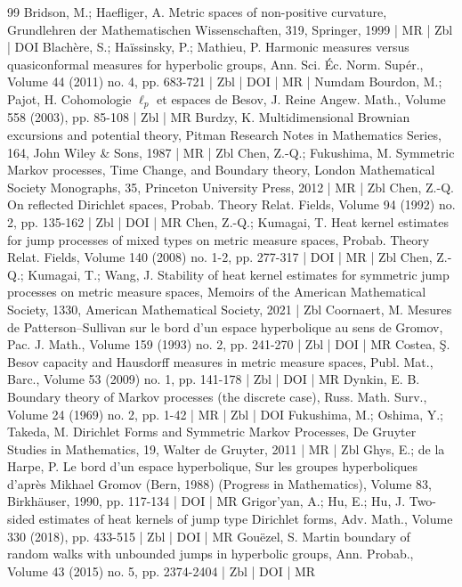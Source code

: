 \begin{thebibliography}{99}
 Bridson, M.; Haefliger, A. Metric spaces of non-positive curvature, Grundlehren der Mathematischen Wissenschaften, 319, Springer, 1999 | MR | Zbl | DOI
 Blachère, S.; Haïssinsky, P.; Mathieu, P. Harmonic measures versus quasiconformal measures for hyperbolic groups, Ann. Sci. Éc. Norm. Supér., Volume 44 (2011) no. 4, pp. 683-721 | Zbl | DOI | MR | Numdam
 Bourdon, M.; Pajot, H. Cohomologie $\ell _p$ et espaces de Besov, J. Reine Angew. Math., Volume 558 (2003), pp. 85-108 | Zbl | MR
 Burdzy, K. Multidimensional Brownian excursions and potential theory, Pitman Research Notes in Mathematics Series, 164, John Wiley \& Sons, 1987 | MR | Zbl
 Chen, Z.-Q.; Fukushima, M. Symmetric Markov processes, Time Change, and Boundary theory, London Mathematical Society Monographs, 35, Princeton University Press, 2012 | MR | Zbl
 Chen, Z.-Q. On reflected Dirichlet spaces, Probab. Theory Relat. Fields, Volume 94 (1992) no. 2, pp. 135-162 | Zbl | DOI | MR
 Chen, Z.-Q.; Kumagai, T. Heat kernel estimates for jump processes of mixed types on metric measure spaces, Probab. Theory Relat. Fields, Volume 140 (2008) no. 1-2, pp. 277-317 | DOI | MR | Zbl
 Chen, Z.-Q.; Kumagai, T.; Wang, J. Stability of heat kernel estimates for symmetric jump processes on metric measure spaces, Memoirs of the American Mathematical Society, 1330, American Mathematical Society, 2021 | Zbl
 Coornaert, M. Mesures de Patterson–Sullivan sur le bord d’un espace hyperbolique au sens de Gromov, Pac. J. Math., Volume 159 (1993) no. 2, pp. 241-270 | Zbl | DOI | MR
 Costea, Ş. Besov capacity and Hausdorff measures in metric measure spaces, Publ. Mat., Barc., Volume 53 (2009) no. 1, pp. 141-178 | Zbl | DOI | MR
 Dynkin, E. B. Boundary theory of Markov processes (the discrete case), Russ. Math. Surv., Volume 24 (1969) no. 2, pp. 1-42 | MR | Zbl | DOI
 Fukushima, M.; Oshima, Y.; Takeda, M. Dirichlet Forms and Symmetric Markov Processes, De Gruyter Studies in Mathematics, 19, Walter de Gruyter, 2011 | MR | Zbl
 Ghys, E.; de la Harpe, P. Le bord d’un espace hyperbolique, Sur les groupes hyperboliques d’après Mikhael Gromov (Bern, 1988) (Progress in Mathematics), Volume 83, Birkhäuser, 1990, pp. 117-134 | DOI | MR
 Grigor’yan, A.; Hu, E.; Hu, J. Two-sided estimates of heat kernels of jump type Dirichlet forms, Adv. Math., Volume 330 (2018), pp. 433-515 | Zbl | DOI | MR
 Gouëzel, S. Martin boundary of random walks with unbounded jumps in hyperbolic groups, Ann. Probab., Volume 43 (2015) no. 5, pp. 2374-2404 | Zbl | DOI | MR

\end{thebibliography}
